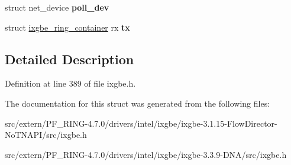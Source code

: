 \begin{DoxyCompactItemize}
\item 
\hypertarget{structixgbe__q__vector_a28d2f33248d7aa2ef2f2537c291bfb51}{
struct net\_\-device {\bfseries poll\_\-dev}}
\label{structixgbe__q__vector_a28d2f33248d7aa2ef2f2537c291bfb51}

\item 
\hypertarget{structixgbe__q__vector_ae55d58bf93ae4455250c437118e17034}{
struct \hyperlink{structixgbe__ring__container}{ixgbe\_\-ring\_\-container} rx {\bfseries tx}}
\label{structixgbe__q__vector_ae55d58bf93ae4455250c437118e17034}

\end{DoxyCompactItemize}


\subsection{Detailed Description}


Definition at line 389 of file ixgbe.h.



The documentation for this struct was generated from the following files:\begin{DoxyCompactItemize}
\item 
src/extern/PF\_\-RING-\/4.7.0/drivers/intel/ixgbe/ixgbe-\/3.1.15-\/FlowDirector-\/NoTNAPI/src/ixgbe.h\item 
src/extern/PF\_\-RING-\/4.7.0/drivers/intel/ixgbe/ixgbe-\/3.3.9-\/DNA/src/ixgbe.h\end{DoxyCompactItemize}
